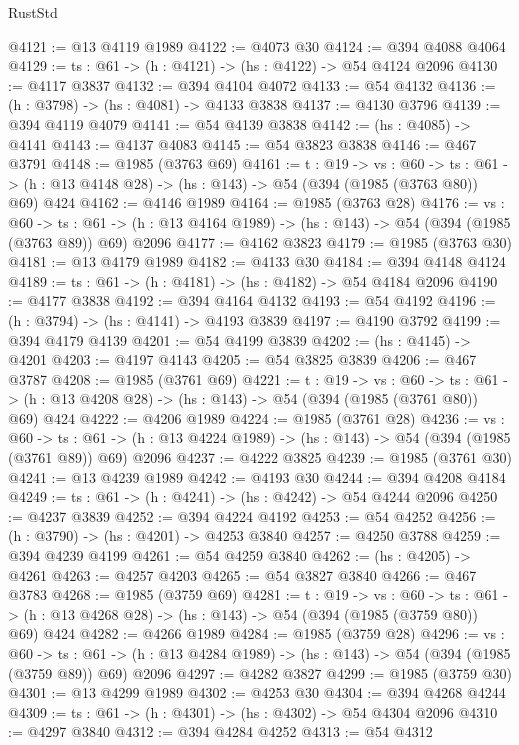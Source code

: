 \begin{lexlean}{RustStd}
\begin{coremodule}
{\begin{coremodule}
{{{{{{{{@4121 := @13 @4119 @1989
@4122 := @4073 @30
@4124 := @394 @4088 @4064
@4129 := {ts : @61} -> (h : @4121) -> (hs : @4122) -> @54 @4124 @2096
@4130 := @4117 @3837
@4132 := @394 @4104 @4072
@4133 := @54 @4132
@4136 := (h : @3798) -> (hs : @4081) -> @4133 @3838
@4137 := @4130 @3796
@4139 := @394 @4119 @4079
@4141 := @54 @4139 @3838
@4142 := (hs : @4085) -> @4141
@4143 := @4137 @4083
@4145 := @54 @3823 @3838
@4146 := @467 @3791
@4148 := @1985 (@3763 @69)
@4161 := {t : @19} ->
  {vs : @60} ->
  {ts : @61} -> (h : @13 @4148 @28) -> (hs : @143) -> @54 (@394 (@1985 (@3763 @80)) @69) @424
@4162 := @4146 @1989
@4164 := @1985 (@3763 @28)
@4176 := {vs : @60} ->
  {ts : @61} -> (h : @13 @4164 @1989) -> (hs : @143) -> @54 (@394 (@1985 (@3763 @89)) @69) @2096
@4177 := @4162 @3823
@4179 := @1985 (@3763 @30)
@4181 := @13 @4179 @1989
@4182 := @4133 @30
@4184 := @394 @4148 @4124
@4189 := {ts : @61} -> (h : @4181) -> (hs : @4182) -> @54 @4184 @2096
@4190 := @4177 @3838
@4192 := @394 @4164 @4132
@4193 := @54 @4192
@4196 := (h : @3794) -> (hs : @4141) -> @4193 @3839
@4197 := @4190 @3792
@4199 := @394 @4179 @4139
@4201 := @54 @4199 @3839
@4202 := (hs : @4145) -> @4201
@4203 := @4197 @4143
@4205 := @54 @3825 @3839
@4206 := @467 @3787
@4208 := @1985 (@3761 @69)
@4221 := {t : @19} ->
  {vs : @60} ->
  {ts : @61} -> (h : @13 @4208 @28) -> (hs : @143) -> @54 (@394 (@1985 (@3761 @80)) @69) @424
@4222 := @4206 @1989
@4224 := @1985 (@3761 @28)
@4236 := {vs : @60} ->
  {ts : @61} -> (h : @13 @4224 @1989) -> (hs : @143) -> @54 (@394 (@1985 (@3761 @89)) @69) @2096
@4237 := @4222 @3825
@4239 := @1985 (@3761 @30)
@4241 := @13 @4239 @1989
@4242 := @4193 @30
@4244 := @394 @4208 @4184
@4249 := {ts : @61} -> (h : @4241) -> (hs : @4242) -> @54 @4244 @2096
@4250 := @4237 @3839
@4252 := @394 @4224 @4192
@4253 := @54 @4252
@4256 := (h : @3790) -> (hs : @4201) -> @4253 @3840
@4257 := @4250 @3788
@4259 := @394 @4239 @4199
@4261 := @54 @4259 @3840
@4262 := (hs : @4205) -> @4261
@4263 := @4257 @4203
@4265 := @54 @3827 @3840
@4266 := @467 @3783
@4268 := @1985 (@3759 @69)
@4281 := {t : @19} ->
  {vs : @60} ->
  {ts : @61} -> (h : @13 @4268 @28) -> (hs : @143) -> @54 (@394 (@1985 (@3759 @80)) @69) @424
@4282 := @4266 @1989
@4284 := @1985 (@3759 @28)
@4296 := {vs : @60} ->
  {ts : @61} -> (h : @13 @4284 @1989) -> (hs : @143) -> @54 (@394 (@1985 (@3759 @89)) @69) @2096
@4297 := @4282 @3827
@4299 := @1985 (@3759 @30)
@4301 := @13 @4299 @1989
@4302 := @4253 @30
@4304 := @394 @4268 @4244
@4309 := {ts : @61} -> (h : @4301) -> (hs : @4302) -> @54 @4304 @2096
@4310 := @4297 @3840
@4312 := @394 @4284 @4252
@4313 := @54 @4312
}}}}}}}}
\end{coremodule}}
\end{coremodule}
\end{lexlean}
